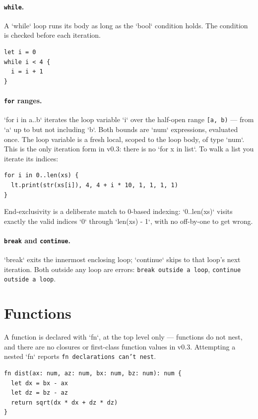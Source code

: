 \paragraph{\texttt{while}.} A `while` loop runs its body as long as the
`bool` condition holds. The condition is checked before each iteration.

\begin{lstlisting}[language=wick]
let i = 0
while i < 4 {
  i = i + 1
}
\end{lstlisting}

\paragraph{\texttt{for} ranges.} `for i in a..b` iterates the loop variable
`i` over the half-open range \texttt{[a, b)} --- from `a` up to but not
including `b`. Both bounds are `num` expressions, evaluated once. The loop
variable is a fresh local, scoped to the loop body, of type `num`. This is the
only iteration form in v0.3: there is no `for x in list`. To walk a list you
iterate its indices:

\begin{lstlisting}[language=wick]
for i in 0..len(xs) {
  lt.print(str(xs[i]), 4, 4 + i * 10, 1, 1, 1, 1)
}
\end{lstlisting}

\noindent
End-exclusivity is a deliberate match to 0-based indexing: `0..len(xs)` visits
exactly the valid indices `0` through `len(xs) - 1`, with no off-by-one to get
wrong.

\paragraph{\texttt{break} and \texttt{continue}.} `break` exits the innermost
enclosing loop; `continue` skips to that loop's next iteration. Both outside
any loop are errors: \texttt{break outside a loop},
\texttt{continue outside a loop}.

\section{Functions}

A function is declared with `fn`, at the top level only --- functions do not
nest, and there are no closures or first-class function values in v0.3.
Attempting a nested `fn` reports \texttt{fn declarations can't nest}.

\begin{lstlisting}[language=wick]
fn dist(ax: num, az: num, bx: num, bz: num): num {
  let dx = bx - ax
  let dz = bz - az
  return sqrt(dx * dx + dz * dz)
}
\end{lstlisting}

